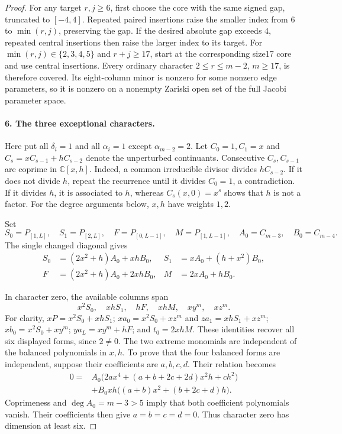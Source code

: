 \begin{proof}
For any target $r,j\geq6$, first choose the core with the same
signed gap, truncated to $[-4,4]$. Repeated paired insertions
raise the smaller index from $6$ to $\min(r,j)$, preserving
the gap. If the desired absolute gap exceeds $4$, repeated
central insertions then raise the larger index to its target.
For $\min(r,j)\in\{2,3,4,5\}$ and $r+j\geq17$, start at
the corresponding size17 core and use central insertions.
Every ordinary character $2\leq r\leq m-2$, $m\geq17$, is
therefore covered. Its eight-column minor is nonzero for some
nonzero edge parameters, so it is nonzero on a nonempty Zariski
open set of the full Jacobi parameter space.

\paragraph{6. The three exceptional characters.}
Here put all $\delta_i=1$ and all $\alpha_i=1$ except
$\alpha_{m-2}=2$. Let $C_0=1,C_1=x$ and
$C_s=xC_{s-1}+hC_{s-2}$ denote the unperturbed continuants.
Consecutive $C_s,C_{s-1}$ are coprime in $\mathbb C[x,h]$.
Indeed, a common irreducible divisor divides $hC_{s-2}$.
If it does not divide $h$, repeat the recurrence until it divides
$C_0=1$, a contradiction. If it divides $h$, it is associated
to $h$, whereas $C_s(x,0)=x^s$ shows that $h$ is not a factor.
For the degree arguments below, $x,h$ have weights $1,2$.

Set
\[
 S_0=P_{[1,L]},\quad S_1=P_{[2,L]},\quad
 F=P_{[0,L-1]},\quad M=P_{[1,L-1]},\quad
 A_0=C_{m-3},\quad B_0=C_{m-4}.
\]
The single changed diagonal gives
\begin{align*}
 S_0&=(2x^2+h)A_0+xhB_0,&
 S_1&=xA_0+(h+x^2)B_0,\\
 F&=(2x^2+h)A_0+2xhB_0,&
 M&=2xA_0+hB_0.
\end{align*}

In character zero, the available columns span
\begin{equation}\label{R26:zero_basis}
 x^2S_0,\quad xhS_1,\quad hF,\quad xhM,\quad xy^m,\quad xz^m.
\end{equation}
For clarity, $xP=x^2S_0+xhS_1$;
$xa_0=x^2S_0+xz^m$ and $za_1=xhS_1+xz^m$;
$xb_0=x^2S_0+xy^m$; $ya_L=xy^m+hF$;
and $t_0=2xhM$. These identities recover all six displayed
forms, since $2\ne0$.
The two extreme monomials are independent of the balanced
polynomials in $x,h$. To prove that the four balanced forms
are independent, suppose their coefficients are $a,b,c,d$.
Their relation becomes
\begin{align*}
0={}&A_0\big(2ax^4+(a+b+2c+2d)x^2h+ch^2\big)\\
 &+B_0xh\big((a+b)x^2+(b+2c+d)h\big).
\end{align*}
Coprimeness and $\deg A_0=m-3>5$ imply that both coefficient
polynomials vanish. Their coefficients then give
$a=b=c=d=0$. Thus character zero has dimension at least six.


\end{proof}
